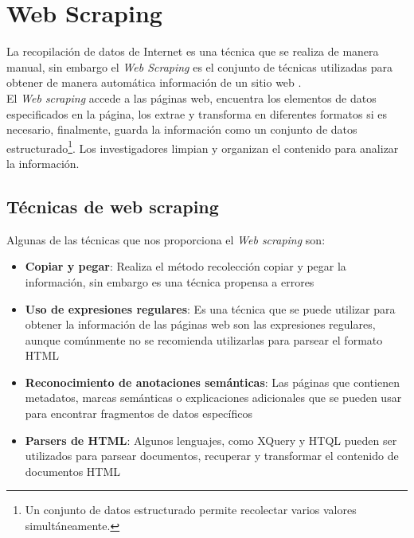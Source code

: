 


\section{Web Scraping}

La recopilación de datos de Internet es una técnica que se realiza de manera manual, sin embargo 
el \textit{Web Scraping} es el conjunto de técnicas utilizadas para obtener de manera automática información de 
un sitio web \citep{CTWebScraping}. 
\\
El \textit{Web scraping} accede a las páginas web, encuentra los elementos de datos especificados en la 
página, los extrae y transforma en diferentes formatos si es necesario, finalmente, guarda 
la información como un conjunto de datos estructurado\footnote{Un conjunto de datos estructurado permite recolectar 
varios valores simultáneamente.}. Los investigadores limpian y organizan el contenido para analizar la información.


\subsection{Técnicas de web scraping}

Algunas de las técnicas que nos proporciona el \textit{Web scraping} son\citep{CTTechniques}:

\begin{itemize}

    \item \textbf{Copiar y pegar}: Realiza el método recolección copiar y pegar la información, 
    sin embargo es una técnica propensa a errores

    \item \textbf{Uso de expresiones regulares}: Es una técnica que se puede utilizar para obtener la información 
    de las páginas web son las expresiones regulares, aunque comúnmente no se recomienda utilizarlas para parsear el formato HTML

    \item \textbf{Reconocimiento de anotaciones semánticas}: Las páginas que contienen metadatos, 
    marcas semánticas o explicaciones adicionales que se pueden usar para encontrar fragmentos de datos específicos

    \item \textbf{Parsers de HTML}: Algunos lenguajes, como XQuery y HTQL pueden ser utilizados para parsear documentos, recuperar 
    y transformar el contenido de documentos HTML

\end{itemize}

